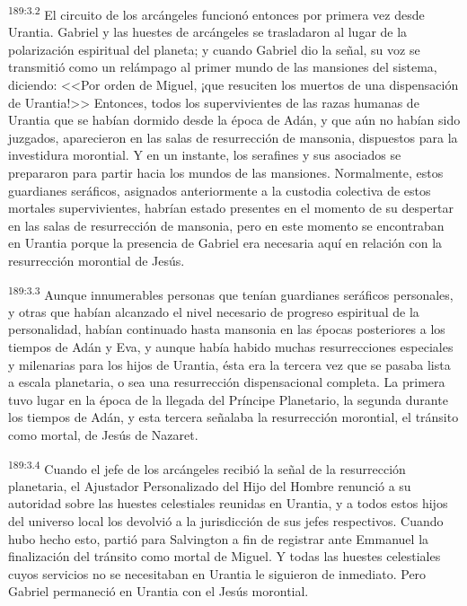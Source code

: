 \par 
\textsuperscript{189:3.2} El circuito de los arcángeles funcionó entonces por primera vez desde Urantia. Gabriel y las huestes de arcángeles se trasladaron al lugar de la polarización espiritual del planeta; y cuando Gabriel dio la señal, su voz se transmitió como un relámpago al primer mundo de las mansiones del sistema, diciendo: <<Por orden de Miguel, ¡que resuciten los muertos de una dispensación de Urantia!>> Entonces, todos los supervivientes de las razas humanas de Urantia que se habían dormido desde la época de Adán, y que aún no habían sido juzgados, aparecieron en las salas de resurrección de mansonia, dispuestos para la investidura morontial. Y en un instante, los serafines y sus asociados se prepararon para partir hacia los mundos de las mansiones. Normalmente, estos guardianes seráficos, asignados anteriormente a la custodia colectiva de estos mortales supervivientes, habrían estado presentes en el momento de su despertar en las salas de resurrección de mansonia, pero en este momento se encontraban en Urantia porque la presencia de Gabriel era necesaria aquí en relación con la resurrección morontial de Jesús.

\par 
\textsuperscript{189:3.3} Aunque innumerables personas que tenían guardianes seráficos personales, y otras que habían alcanzado el nivel necesario de progreso espiritual de la personalidad, habían continuado hasta mansonia en las épocas posteriores a los tiempos de Adán y Eva, y aunque había habido muchas resurrecciones especiales y milenarias para los hijos de Urantia, ésta era la tercera vez que se pasaba lista a escala planetaria, o sea una resurrección dispensacional completa. La primera tuvo lugar en la época de la llegada del Príncipe Planetario, la segunda durante los tiempos de Adán, y esta tercera señalaba la resurrección morontial, el tránsito como mortal, de Jesús de Nazaret.

\par 
\textsuperscript{189:3.4} Cuando el jefe de los arcángeles recibió la señal de la resurrección planetaria, el Ajustador Personalizado del Hijo del Hombre renunció a su autoridad sobre las huestes celestiales reunidas en Urantia, y a todos estos hijos del universo local los devolvió a la jurisdicción de sus jefes respectivos. Cuando hubo hecho esto, partió para Salvington a fin de registrar ante Emmanuel la finalización del tránsito como mortal de Miguel. Y todas las huestes celestiales cuyos servicios no se necesitaban en Urantia le siguieron de inmediato. Pero Gabriel permaneció en Urantia con el Jesús morontial.

